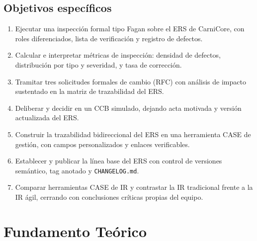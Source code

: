 \documentclass[11pt,a4paper]{article}
\begin{document}
\subsection{Objetivos específicos}
\begin{enumerate}[nosep]
\item Ejecutar una inspección formal tipo Fagan sobre el ERS de CarniCore, con roles diferenciados, lista de verificación y registro de defectos.
\item Calcular e interpretar métricas de inspección: densidad de defectos, distribución por tipo y severidad, y tasa de corrección.
\item Tramitar tres solicitudes formales de cambio (RFC) con análisis de impacto sustentado en la matriz de trazabilidad del ERS.
\item Deliberar y decidir en un CCB simulado, dejando acta motivada y versión actualizada del ERS.
\item Construir la trazabilidad bidireccional del ERS en una herramienta CASE de gestión, con campos personalizados y enlaces verificables.
\item Establecer y publicar la línea base del ERS con control de versiones semántico, tag anotado y \texttt{CHANGELOG.md}.
\item Comparar herramientas CASE de IR y contrastar la IR tradicional frente a la IR ágil, cerrando con conclusiones críticas propias del equipo.
\end{enumerate}

\section{Fundamento Teórico}
\end{document}
